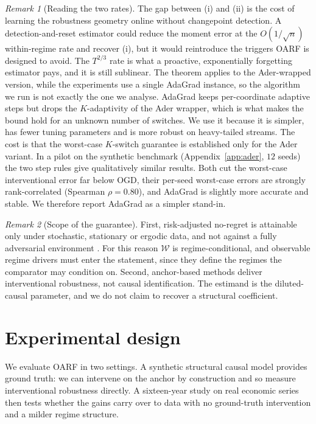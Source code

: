 \documentclass[11pt]{article}
\theoremstyle{plain}
\theoremstyle{remark}
\newtheorem{remark}{Remark}
\newcommand{\OARF}{\textsc{OARF}}
\begin{document}
\begin{remark}[Reading the two rates]\label{rem:rates}
The gap between (i) and (ii) is the cost of learning the robustness geometry online
without changepoint detection. A detection-and-reset estimator could reduce the moment
error at the $O(1/\sqrt{n})$ within-regime rate and recover (i), but it would
reintroduce the triggers \OARF{} is designed to avoid. The $T^{2/3}$ rate is what a
proactive, exponentially forgetting estimator pays, and it is still sublinear. The theorem applies to the Ader-wrapped
version, while the experiments use a single AdaGrad instance, so the algorithm we run
is not exactly the one we analyse. AdaGrad keeps per-coordinate adaptive steps but
drops the $K$-adaptivity of the Ader wrapper, which is what makes the bound hold for
an unknown number of switches. We use it because it is simpler, has fewer tuning
parameters and is more robust on heavy-tailed streams. The cost is that the worst-case
$K$-switch guarantee is established only for the Ader variant. In a pilot on the
synthetic benchmark (Appendix~\ref{app:ader}, $12$ seeds) the two step rules give
qualitatively similar results. Both cut the worst-case interventional error far below
OGD, their per-seed worst-case errors are strongly rank-correlated (Spearman
$\rho=0.80$), and AdaGrad is slightly more accurate and stable. We therefore report
AdaGrad as a simpler stand-in.
\end{remark}

\begin{remark}[Scope of the guarantee]\label{rem:honesty}
First, risk-adjusted no-regret is attainable only under
stochastic, stationary or ergodic data, and not against a fully adversarial
environment \citep{uziel2017growth}. For this reason $\mathcal{W}$ is
regime-conditional, and observable regime drivers must enter the statement, since they
define the regimes the comparator may condition on. Second, anchor-based methods
deliver interventional robustness, not causal identification. The estimand is the
diluted-causal parameter, and we do not claim to recover a structural coefficient.
\end{remark}

\section{Experimental design}\label{sec:setup}

We evaluate \OARF{} in two settings. A synthetic structural causal model provides ground
truth: we can intervene on the anchor by construction and so measure interventional
robustness directly. A sixteen-year study on real economic series then tests whether
the gains carry over to data with no ground-truth intervention and a milder regime
structure. 
\end{document}
